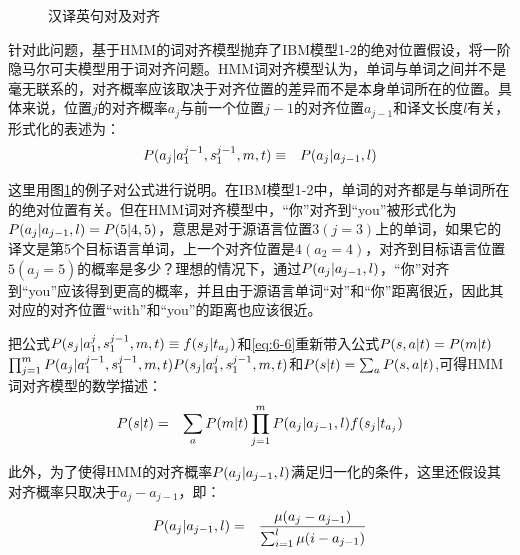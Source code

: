 \begin{figure}[htp]
    \centering

    \caption{汉译英句对及对齐}
    \label{fig:6-4}
\end{figure}

\parinterval 针对此问题，基于HMM的词对齐模型抛弃了IBM模型1-2的绝对位置假设，将一阶隐马尔可夫模型用于词对齐问题。HMM词对齐模型认为，单词与单词之间并不是毫无联系的，对齐概率应该取决于对齐位置的差异而不是本身单词所在的位置。具体来说，位置$j$的对齐概率$a_j$与前一个位置$j-1$的对齐位置$a_{j-1}$和译文长度$l$有关，形式化的表述为：
\begin{eqnarray}
{P}(a_{j}|a_{1}^{j-1},s_{1}^{j-1},m,{t})& \equiv & {P}(a_{j}|a_{j-1},l)
\label{eq:6-6}
\end{eqnarray}

\parinterval 这里用图\ref{fig:6-4}的例子对公式进行说明。在IBM模型1-2中，单词的对齐都是与单词所在的绝对位置有关。但在HMM词对齐模型中，“你”对齐到“you”被形式化为${P}(a_{j}|a_{j-1},l)= P(5|4,5)$，意思是对于源语言位置$3(j=3)$上的单词，如果它的译文是第5个目标语言单词，上一个对齐位置是$4(a_{2}=4)$，对齐到目标语言位置$5(a_{j}=5)$的概率是多少？理想的情况下，通过${P}(a_{j}|a_{j-1},l)$，“你”对齐到“you”应该得到更高的概率，并且由于源语言单词“对”和“你”距离很近，因此其对应的对齐位置“with”和“you”的距离也应该很近。

\parinterval 把公式${P}(s_j|a_1^{j},s_1^{j-1},m,{t}) \equiv f(s_j|t_{a_j})$和\eqref{eq:6-6}重新带入公式${P}({s},{a}|{t})={P}(m|{t})$\\$\prod_{j=1}^{m}{{P}(a_j|a_1^{j-1},s_1^{j-1},m,{t}){P}(s_j|a_1^{j},s_1^{j-1},m,{t})}$和${P}({s}|{t})= \sum_{{a}}{P}({s},{a}|{t})$,可得HMM词对齐模型的数学描述：
\begin{eqnarray}
{P}({s}| {t})& =& \sum_{{a}}{{P}(m|{t})}\prod_{j=1}^{m}{{P}(a_{j}|a_{j-1},l)f(s_{j}|t_{a_j})}
\label{eq:6-7}
\end{eqnarray}

\parinterval 此外，为了使得HMM的对齐概率${P}(a_{j}|a_{j-1},l)$满足归一化的条件，这里还假设其对齐概率只取决于$a_{j}-a_{j-1}$，即：
\begin{eqnarray}
{P}(a_{j}|a_{j-1},l)& = & \frac{\mu(a_{j}-a_{j-1})}{\sum_{i=1}^{l}{\mu(i-a_{j-1})}}
\label{eq:6-8}
\end{eqnarray}


